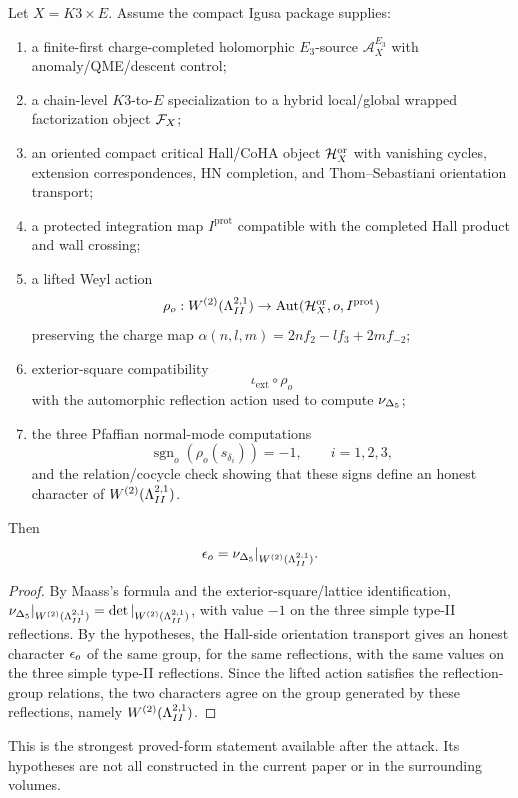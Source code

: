 \begin{theorem}
Let \(X=K3\times E\).  Assume the compact Igusa package supplies:
\begin{enumerate}
\item a finite-first charge-completed holomorphic \(E_3\)-source
\(\mathcal A_X^{E_3}\) with anomaly/QME/descent control;
\item a chain-level \(K3\)-to-\(E\) specialization to a hybrid
local/global wrapped factorization object \(\mathcal F_X\);
\item an oriented compact critical Hall/CoHA object \(\mathcal H_X^{\mathrm{or}}\)
with vanishing cycles, extension correspondences, HN completion, and
Thom--Sebastiani orientation transport;
\item a protected integration map \(I^{\mathrm{prot}}\) compatible with
the completed Hall product and wall crossing;
\item a lifted Weyl action
\[
        \rho_o:W^{(2)}(\Lambda^{2,1}_{II})\to
        \operatorname{Aut}(\mathcal H_X^{\mathrm{or}},o,I^{\mathrm{prot}})
\]
preserving the charge map \(\alpha(n,l,m)=2nf_2-lf_3+2mf_{-2}\);
\item exterior-square compatibility
\[
        \iota_{\mathrm{ext}}\circ\rho_o
\]
with the automorphic reflection action used to compute
\(\nu_{\Delta_5}\);
\item the three Pfaffian normal-mode computations
\[
        \operatorname{sgn}_o(\rho_o(s_{\delta_i}))=-1,
        \qquad i=1,2,3,
\]
and the relation/cocycle check showing that these signs define an honest
character of \(W^{(2)}(\Lambda^{2,1}_{II})\).
\end{enumerate}
Then
\[
        \epsilon_o
        =
        \nu_{\Delta_5}|_{W^{(2)}(\Lambda^{2,1}_{II})}.
\]
\end{theorem}

\begin{proof}
By Maass's formula and the exterior-square/lattice identification,
\(\nu_{\Delta_5}|_{W^{(2)}(\Lambda^{2,1}_{II})}=\det|_{W^{(2)}(\Lambda^{2,1}_{II})}\), with value \(-1\) on the three
simple type-II reflections.  By the hypotheses, the Hall-side
orientation transport gives an honest character \(\epsilon_o\) of the same
group, for the same reflections, with the same values on the three
simple type-II reflections.  Since the lifted action satisfies the
reflection-group relations, the two characters agree on the group
generated by these reflections, namely \(W^{(2)}(\Lambda^{2,1}_{II})\).
\end{proof}

This is the strongest proved-form statement available after the attack.
Its hypotheses are not all constructed in the current paper or in the
surrounding volumes.

